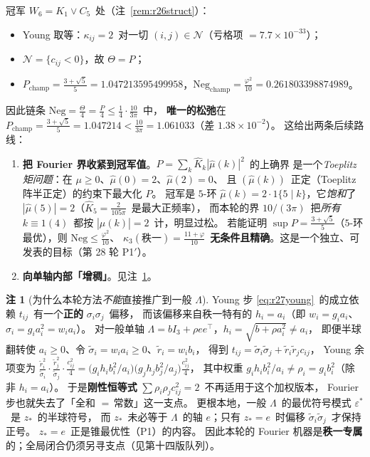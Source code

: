 \documentclass[UTF8,11pt]{ctexart}
\theoremstyle{definition}
\newtheorem{remark}[theorem]{注}
\newcommand{\Lam}{\Lambda}
\begin{document}
冠军 $W_6=K_1\vee C_5$~处（注~\ref{rem:r26struct}）：
\begin{itemize}\itemsep=1pt
\item Young 取等：$\kappa_{ij}=2$~对一切 $(i,j)\in\mathcal N$（亏格项 $=7.7\times10^{-33}$）；
\item $\mathcal N=\{c_{ij}<0\}$，故 $\Theta=P$；
\item $P_{\text{champ}}=\frac{3+\sqrt5}5=1.047213595499958$，$\mathrm{Neg}_{\text{champ}}=\frac{\varphi^2}{10}=0.261803398874989$。
\end{itemize}
因此链条 $\mathrm{Neg}=\frac\Theta4=\frac P4\le\frac14\cdot\frac{10}{3\pi}$~中，
\textbf{唯一的松弛}在 $P_{\text{champ}}=\frac{3+\sqrt5}5=1.047214<\frac{10}{3\pi}=1.061033$（差 $1.38\times10^{-2}$）。
这给出两条后续路线：
\begin{enumerate}\itemsep=1pt
\item[\textbf{(i)}]\textbf{把 Fourier 界收紧到冠军值}。$P=\sum_k\widehat K_k|\widehat\mu(k)|^2$~的上确界
是一个\emph{Toeplitz 矩问题}：在 $\mu\ge0$、$\widehat\mu(0)=2$、$\widehat\mu(2)=0$、
且 $(\widehat\mu(k))$~正定（Toeplitz 阵半正定）的约束下最大化 $P$。
冠军是 $5$-环 $\widehat\mu(k)=2\cdot1\{5\mid k\}$，它\emph{饱和}了 $|\widehat\mu(5)|=2$（$\widehat K_5=\frac2{105\pi}$~是最大正频率），
而本轮的界 $10/(3\pi)$~把\emph{所有} $k\equiv1(4)$~都按 $|\widehat\mu(k)|=2$~计，明显过松。
若能证明 $\sup P=\frac{3+\sqrt5}5$（$5$-环最优），则 $\mathrm{Neg}\le\frac{\varphi^2}{10}$、
$\kappa_3(\text{秩一})=\frac{11+\varphi}{10}$~\textbf{无条件且精确}。这是一个独立、可发表的目标（第 28 轮 P1$'$）。
\item[\textbf{(ii)}]\textbf{向单轴内部「增稠」}。见注~\ref{rem:r27global}。
\end{enumerate}

\begin{remark}[为什么本轮方法\emph{不能}直接推广到一般 $\Lam$]\label{rem:r27global}
Young 步 \eqref{eq:r27young}~的成立依赖 $t_{ij}$~有一个\textbf{正的} $\sigma_i\sigma_j$~偏移，
而该偏移来自秩一特有的 $h_i=a_i$（即 $w_i=g_ia_i$、$\sigma_i=g_ia_i^2=w_ia_i$）。
对一般单轴 $\Lam=bI_3+\rho ee^\top$，$h_i=\sqrt{b+\rho a_i^2}\ne a_i$，
即便半球翻转使 $a_i\ge0$、令 $\widetilde\sigma_i=w_ia_i\ge0$、$\widetilde r_i=w_ib_i$，
得到 $t_{ij}=\widetilde\sigma_i\widetilde\sigma_j+\widetilde r_i\widetilde r_jc_{ij}$，
Young 余项变为 $\frac{\widetilde r_i^2}{\widetilde\sigma_i}\cdot\frac{\widetilde r_j^2}{\widetilde\sigma_j}\cdot\frac{c_{ij}^2}4
=\bigl(g_ih_ib_i^2/a_i\bigr)\bigl(g_jh_jb_j^2/a_j\bigr)\frac{c_{ij}^2}4$，
其中权重 $g_ih_ib_i^2/a_i\ne\rho_i=g_ib_i^2$（除非 $h_i=a_i$）。
于是\textbf{刚性恒等式} $\sum\rho_i\rho_jc_{ij}^2=2$~不再适用于这个加权版本，
Fourier 步也就失去了「全和 $=$\,常数」这一支点。
更根本地，一般 $\Lam$~的最优符号模式 $\varepsilon^*$~是 $z_*$~的半球符号，
而 $z_*$~未必等于 $\Lam$~的轴 $e$；只有 $z_*=e$~时偏移 $\widetilde\sigma_i\widetilde\sigma_j$~才保持正号。
$z_*=e$~正是锥最优性（P1）的内容。
因此本轮的 Fourier 机器是\textbf{秩一专属}的；全局闭合仍须另寻支点（见第十四版队列）。
\end{remark}
\end{document}
